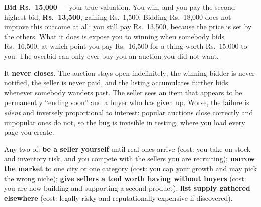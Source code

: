 \begin{ans}
  \item \textbf{Bid Rs.~15{,}000} --- your true valuation. You win, and you pay
        the second-highest bid, \textbf{Rs.~13{,}500}, gaining Rs.~1{,}500.
        Bidding Rs.~18{,}000 does not improve this outcome at all: you still
        pay Rs.~13{,}500, because the price is set by the others. What it does
        is expose you to winning when somebody bids Rs.~16{,}500, at which
        point you pay Rs.~16{,}500 for a thing worth Rs.~15{,}000 to you. The
        overbid can only ever buy you an auction you did not want.
  \item It \textbf{never closes}. The auction stays open indefinitely; the
        winning bidder is never notified, the seller is never paid, and the
        listing accumulates further bids whenever somebody wanders past. The
        seller sees an item that appears to be permanently ``ending soon'' and
        a buyer who has given up. Worse, the failure is \emph{silent} and
        inversely proportional to interest: popular auctions close correctly
        and unpopular ones do not, so the bug is invisible in testing, where
        you load every page you create.
  \item Any two of: \textbf{be a seller yourself} until real ones arrive
        (cost: you take on stock and inventory risk, and you compete with the
        sellers you are recruiting); \textbf{narrow the market} to one city or
        one category (cost: you cap your growth and may pick the wrong niche);
        \textbf{give sellers a tool worth having without buyers} (cost: you are
        now building and supporting a second product); \textbf{list supply
        gathered elsewhere} (cost: legally risky and reputationally
        expensive if discovered).
\end{ans}

